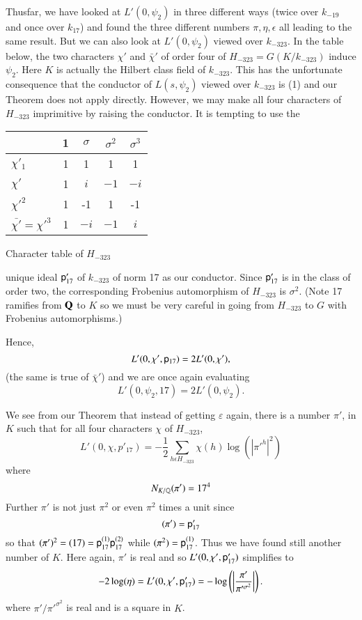 Thus\pageoriginale far, we have looked at $L' (0, \psi_2)$ in three different ways (twice over $k_{-19}$ and once over $k_{17}$) and found the three different numbers $\pi, \eta, \epsilon$ all leading to the same result. But we can also look at $L' (0, \psi_2)$ viewed over $k_{-323}$. In the table below, the two characters $\chi'$ and $\bar{\chi}'$ of order four of $H_{-323} = G(K/k_{-323})$ induce $\psi_2$. Here $K$ is actually the Hilbert class field of $k_{-323}$. This has the unfortunate consequence that the conductor of $L(s, \psi_2)$ viewed over $k_{-323}$ is (1) and our Theorem does not apply directly. However, we may make all four characters of $H_{-323}$ imprimitive by raising the conductor. It is tempting to use the 
\begin{center}
{\renewcommand{\arraystretch}{1.2}
\tabcolsep=12pt
\begin{tabular}{l|c|c|c|c}
\hline
& 1 & $\sigma$ & $\sigma^2$ & $\sigma^3$\\\hline
$\chi'_1$ & 1&1&1&1\\\hline
$\chi'$ & 1 &$i$ & $-1$ &$-i$\\\hline
$\chi'^2$ & 1&-1&1&-1\\\hline
$\bar{\chi'} = \chi'^3$ & 1&$-i$& $-1$ &$i$\\\hline
\end{tabular}}

\smallskip
Character table of $H_{-323}$
\end{center}
unique ideal $\mathsf{p}'_{17}$ of $k_{-323}$ of norm 17 as our conductor. Since $\mathsf{p}'_{17}$ is in the class of order two, the corresponding Frobenius automorphism of $H_{-323}$ is $\sigma^2$. (Note 17 ramifies from $\mathbf{Q}$ to $K$ so we must be very careful in going from $H_{-323}$ to $G$ with Frobenius automorphisms.)

Hence, 
$$
L' (0, \chi', \mathsf{p}_{17}) = 2 L' (0, \chi'),
$$
(the same is true of $\bar{\chi}'$) and we are once again evaluating
$$
L' (0, \psi_2, 17) = 2 L' (0, \psi_2).
$$

We see from our Theorem that instead of getting $\varepsilon$ again, there is a number $\pi'$, in $K$ such that for all four characters $\chi$ of $H_{-323}$,
$$
L' (0, \chi, p'_{17}) =- \frac{1}{2} \sum\limits_{h \epsilon H_{-323}} \chi (h) \log (|\pi'^{h}|^2) 
$$
where\pageoriginale
$$
N_{K/\mathbb{Q}} (\pi') = 17^4
$$
Further $\pi'$ is not just $\pi^2$ or even $\pi^2$ times a unit since
$$
(\pi') = \mathsf{p}'_{17}
$$
so that $(\pi')^2 = (17) = \mathsf{p}^{(1)}_{17} \mathsf{p}^{(2)}_{17}$ while $(\pi^2) = \mathsf{p}^{(1)}_{17}$. Thus we have found still another number of $K$. Here again, $\pi'$ is real and so $L' (0, \chi', \mathsf{p}'_{17})$ simplifies to 
$$
-2 \log (\eta) = L' (0, \chi', \mathsf{p}'_{17}) = - \log\left(\left|\frac{\pi'}{\pi'^{\sigma^2}} \right| \right).
$$
where $\pi'/\pi'^{\sigma^2}$ is real and is a square in $K$.

